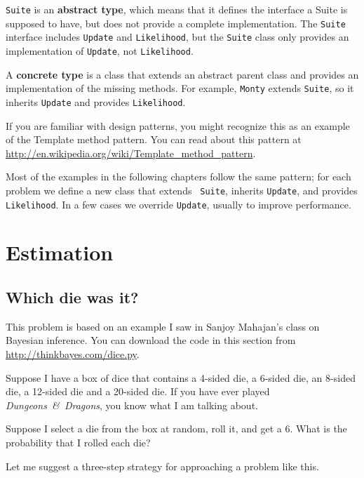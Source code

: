 \documentclass[12pt]{book}
\begin{document}
{\tt Suite} is an {\bf abstract type}, which means that it defines the
interface a Suite is supposed to have, but does not provide a complete
implementation.  The {\tt Suite} interface includes {\tt Update} and
{\tt Likelihood}, but the {\tt Suite} class only provides an
implementation of {\tt Update}, not {\tt Likelihood}.
  

A {\bf concrete type} is a class that extends an abstract parent
class and provides an implementation of the missing methods.
For example, {\tt Monty} extends {\tt Suite}, so it inherits
{\tt Update} and provides {\tt Likelihood}.

If you are familiar with
design patterns, you might recognize this as an example of the
Template method pattern.
You can read about this pattern at
\url{http://en.wikipedia.org/wiki/Template_method_pattern}.

Most of the examples in the following chapters follow the same
pattern; for each problem we define a new class that extends {\tt
  Suite}, inherits {\tt Update}, and provides {\tt Likelihood}.  In a
few cases we override {\tt Update}, usually to improve performance.



\chapter{Estimation}
\label{estimation}

\section{Which die was it?}

This problem is based on an example I saw in Sanjoy Mahajan's class on
Bayesian inference.  You can download the code in this section from
\url{http://thinkbayes.com/dice.py}.

Suppose I have a box of dice that contains a 4-sided die, a 6-sided
die, an 8-sided die, a 12-sided die and a 20-sided die.  If you
have ever played {\it Dungeons~\&~Dragons}, you know what I am talking about.

Suppose I select a die from the box at random, roll it, and get a 6.
What is the probability that I rolled each die?

Let me suggest a three-step strategy for approaching a problem like this.
\end{document}
